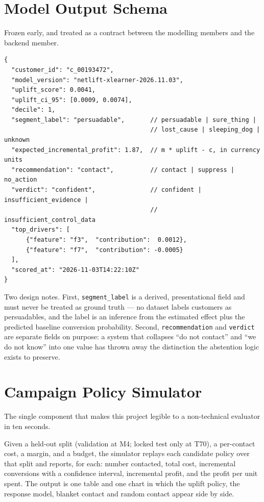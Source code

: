 \documentclass[11pt,a4paper]{article}
\begin{document}
\section{Model Output Schema}
\label{sec:schema}

Frozen early, and treated as a contract between the modelling members and the backend member.

{\footnotesize
\begin{verbatim}
{
  "customer_id": "c_00193472",
  "model_version": "netlift-xlearner-2026.11.03",
  "uplift_score": 0.0041,
  "uplift_ci_95": [0.0009, 0.0074],
  "decile": 1,
  "segment_label": "persuadable",       // persuadable | sure_thing |
                                        // lost_cause | sleeping_dog | unknown
  "expected_incremental_profit": 1.87,  // m * uplift - c, in currency units
  "recommendation": "contact",          // contact | suppress | no_action
  "verdict": "confident",               // confident | insufficient_evidence |
                                        //             insufficient_control_data
  "top_drivers": [
      {"feature": "f3",  "contribution":  0.0012},
      {"feature": "f7",  "contribution": -0.0005}
  ],
  "scored_at": "2026-11-03T14:22:10Z"
}
\end{verbatim}}

Two design notes. First, \texttt{segment\_label} is a derived, presentational field and must never
be treated as ground truth --- no dataset labels customers as persuadables, and the label is an
inference from the estimated effect plus the predicted baseline conversion probability. Second,
\texttt{recommendation} and \texttt{verdict} are separate fields on purpose: a system that collapses
``do not contact'' and ``we do not know'' into one value has thrown away the distinction the
abstention logic exists to preserve.

\section{Campaign Policy Simulator}
\label{sec:simulator}

The single component that makes this project legible to a non-technical evaluator in ten seconds.

Given a held-out split (validation at M4; locked test only at T70), a per-contact cost, a margin,
and a budget, the simulator replays each candidate policy over that split and reports, for each: number contacted, total
cost, incremental conversions with a confidence interval, incremental profit, and the profit
per unit spent. The output is one table and one chart in which the uplift policy, the response
model, blanket contact and random contact appear side by side.
\end{document}
